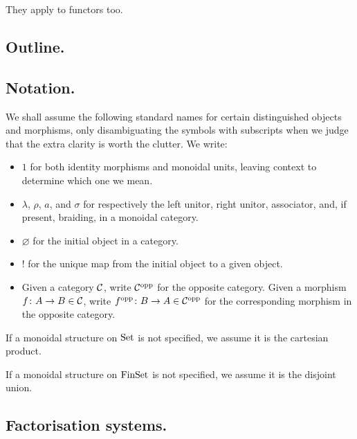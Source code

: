 They apply to functors too.


\subsection{Outline.}
\subsection{Notation.}
We shall assume the following standard names for certain distinguished objects
and morphisms, only disambiguating the symbols with subscripts when we judge
that the extra clarity is worth the clutter. We write: 
\begin{itemize} 
  \item $1$ for both identity morphisms and monoidal units, leaving context to
    determine which one we mean.
  \item $\lambda$, $\rho$, $a$, and $\sigma$ for respectively the left unitor, right unitor,
    associator, and, if present, braiding, in a monoidal category.
  \item $\varnothing$ for the initial object in a category.
  \item $!$ for the unique map from the initial object to a given object.
  \item Given a category $\mathcal C$, write $\mathcal C^{\mathrm{opp}}$ for the opposite category.
    Given a morphism $f{\colon} A \to B \in \mathcal C$, write $f^{\mathrm{opp}}{\colon} B \to A \in
    \mathcal C^{\mathrm{opp}}$ for the corresponding morphism in the opposite category.
\end{itemize}

If a monoidal structure on $\mathrm{Set}$ is not specified, we assume it is the
cartesian product. 

If a monoidal structure on $\mathrm{FinSet}$ is not specified, we assume it is the
disjoint union. 


\subsection{Factorisation systems.}


